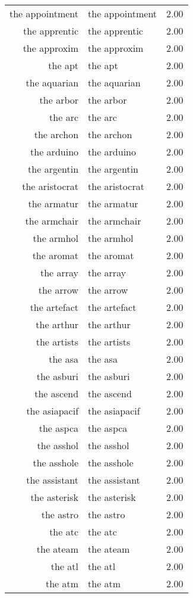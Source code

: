 \begin{table}[ht]
\begin{tabular}{rlr}
  the appointment & the appointment & 2.00 \\ 
  the apprentic & the apprentic & 2.00 \\ 
  the approxim & the approxim & 2.00 \\ 
  the apt & the apt & 2.00 \\ 
  the aquarian & the aquarian & 2.00 \\ 
  the arbor & the arbor & 2.00 \\ 
  the arc & the arc & 2.00 \\ 
  the archon & the archon & 2.00 \\ 
  the arduino & the arduino & 2.00 \\ 
  the argentin & the argentin & 2.00 \\ 
  the aristocrat & the aristocrat & 2.00 \\ 
  the armatur & the armatur & 2.00 \\ 
  the armchair & the armchair & 2.00 \\ 
  the armhol & the armhol & 2.00 \\ 
  the aromat & the aromat & 2.00 \\ 
  the array & the array & 2.00 \\ 
  the arrow & the arrow & 2.00 \\ 
  the artefact & the artefact & 2.00 \\ 
  the arthur & the arthur & 2.00 \\ 
  the artists & the artists & 2.00 \\ 
  the asa & the asa & 2.00 \\ 
  the asburi & the asburi & 2.00 \\ 
  the ascend & the ascend & 2.00 \\ 
  the asiapacif & the asiapacif & 2.00 \\ 
  the aspca & the aspca & 2.00 \\ 
  the asshol & the asshol & 2.00 \\ 
  the asshole & the asshole & 2.00 \\ 
  the assistant & the assistant & 2.00 \\ 
  the asterisk & the asterisk & 2.00 \\ 
  the astro & the astro & 2.00 \\ 
  the atc & the atc & 2.00 \\ 
  the ateam & the ateam & 2.00 \\ 
  the atl & the atl & 2.00 \\ 
  the atm & the atm & 2.00 \\ 

\end{tabular}
\end{table}
